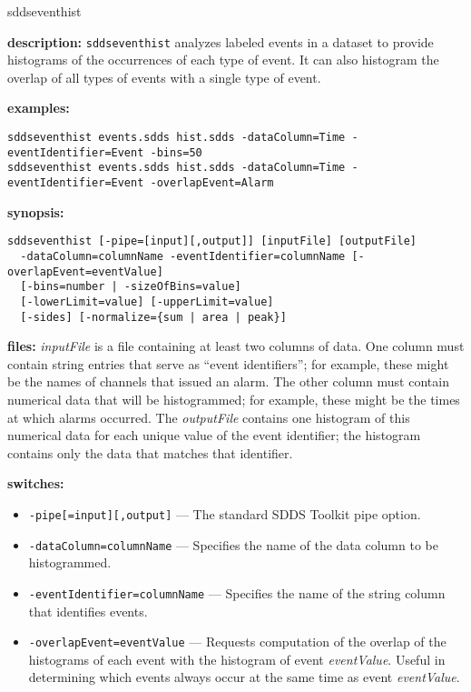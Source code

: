 \begin{sddsprog}{sddseventhist}
  \item \textbf{description:}
  \verb|sddseventhist| analyzes labeled events in a dataset to provide histograms of the occurrences of each type of event. It can also histogram the overlap of all types of events with a single type of event.
  \item \textbf{examples:}
    \begin{verbatim}
sddseventhist events.sdds hist.sdds -dataColumn=Time -eventIdentifier=Event -bins=50
sddseventhist events.sdds hist.sdds -dataColumn=Time -eventIdentifier=Event -overlapEvent=Alarm
    \end{verbatim}
  \item \textbf{synopsis:}
    \begin{verbatim}
sddseventhist [-pipe=[input][,output]] [inputFile] [outputFile]
  -dataColumn=columnName -eventIdentifier=columnName [-overlapEvent=eventValue]
  [-bins=number | -sizeOfBins=value]
  [-lowerLimit=value] [-upperLimit=value]
  [-sides] [-normalize={sum | area | peak}]
    \end{verbatim}
  \item \textbf{files:}
  \emph{inputFile} is a file containing at least two columns of data. One column must contain string entries that serve as ``event identifiers''; for example, these might be the names of channels that issued an alarm. The other column must contain numerical data that will be histogrammed; for example, these might be the times at which alarms occurred. The \emph{outputFile} contains one histogram of this numerical data for each unique value of the event identifier; the histogram contains only the data that matches that identifier.
  \item \textbf{switches:}
    \begin{itemize}
      \item \verb|-pipe[=input][,output]| --- The standard SDDS Toolkit pipe option.
      \item \verb|-dataColumn=columnName| --- Specifies the name of the data column to be histogrammed.
      \item \verb|-eventIdentifier=columnName| --- Specifies the name of the string column that identifies events.
      \item \verb|-overlapEvent=eventValue| --- Requests computation of the overlap of the histograms of each event with the histogram of event \emph{eventValue}. Useful in determining which events always occur at the same time as event \emph{eventValue}.

\end{itemize}
\end{sddsprog}
